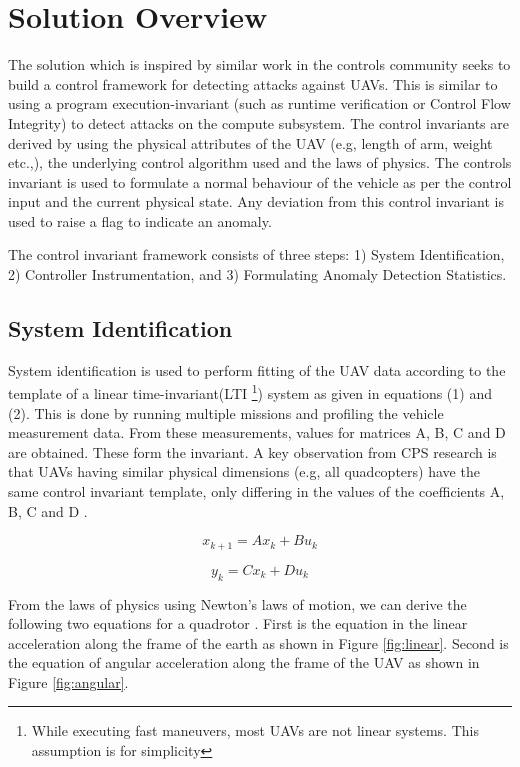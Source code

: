 \section{Solution Overview} The solution which is inspired by similar work in the controls community \cite{mishra2017secure, chong2015observability} seeks to build a control framework for detecting attacks against UAVs. This is similar to using a program execution-invariant (such as runtime verification or Control Flow Integrity) to detect attacks on the compute subsystem. The control invariants are derived by using the physical attributes of the UAV (e.g, length of arm, weight etc.,), the underlying control algorithm used and the laws of physics. The controls invariant is used to formulate a normal behaviour of the vehicle as per the control input and the current physical state. Any deviation from this control invariant is used to raise a flag to indicate an anomaly.

The control invariant framework consists of three steps: 1) System Identification, 2) Controller Instrumentation, and 3) Formulating Anomaly Detection Statistics.

\subsection{System Identification} System identification is used to perform fitting of the UAV data according to the template of a linear time-invariant(LTI \footnote{While executing fast maneuvers, most UAVs are not linear systems. This assumption is for simplicity}) system as given in equations (1) and (2). This is done by running multiple missions and profiling the vehicle measurement data. From these measurements, values for matrices A, B, C and D are obtained. These form the invariant.  A key observation from CPS research \cite{shoukry2018smt, mishra2017secure}  is that UAVs having similar physical dimensions (e.g, all quadcopters) have the same control invariant template, only differing in the values of the coefficients A, B, C and D \cite{bouabdallah2004design}.

\begin{equation}
x_{k+1} = Ax_k + Bu_k
\end{equation}

\begin{equation}
y_k = Cx_k + Du_k
\end{equation}

From the laws of physics using Newton's laws of motion, we can derive the following two equations for a quadrotor \cite{bouabdallah2004design}. First is the equation in the linear acceleration along the frame of the earth as shown in Figure \ref{fig:linear}. Second is the equation of angular acceleration along the frame of the UAV as shown in Figure \ref{fig:angular}.


